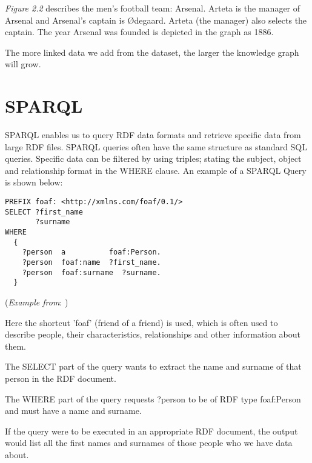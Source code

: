 \textit{Figure 2.2} describes the men's football team: Arsenal. Arteta is the manager of Arsenal and Arsenal's captain is Ødegaard. Arteta (the manager) also selects the captain. The year Arsenal was founded is depicted in the graph as 1886.

The more linked data we add from the dataset, the larger the knowledge graph will grow.

\section{SPARQL}

\hspace{0.5cm} SPARQL enables us to query RDF data formats and retrieve specific data from large RDF files. SPARQL queries often have the same structure as standard SQL queries. Specific data can be filtered by using triples; stating the subject, object and relationship format in the WHERE clause. \cite{sparlbook} An example of a SPARQL Query is shown below:

\begin{lstlisting}
PREFIX foaf: <http://xmlns.com/foaf/0.1/>
SELECT ?first_name 
       ?surname
WHERE
  {
    ?person  a          foaf:Person.
    ?person  foaf:name  ?first_name.
    ?person  foaf:surname  ?surname.
  }
\end{lstlisting}
(\textit{Example from}: \cite{foaf})

\medskip
Here the shortcut 'foaf' (friend of a friend) is used, which is often used to describe people, their characteristics, relationships and other information about them. \cite{foaf}

The SELECT part of the query wants to extract the name and surname of that person in the RDF document. 

The WHERE part of the query requests ?person to be of RDF type foaf:Person and must have a name and surname. 

If the query were to be executed in an appropriate RDF document, the output would list all the first names and surnames of those people who we have data about. 